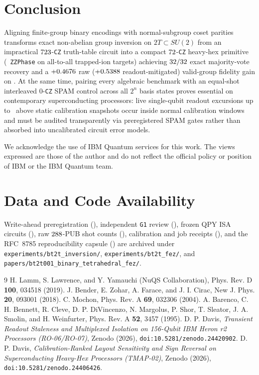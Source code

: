 \documentclass[aps,prx,twocolumn,superscriptaddress,nofootinbib]{revtex4-2}
\begin{document}
\section{Conclusion}
Aligning finite-group binary encodings with normal-subgroup coset parities transforms exact non-abelian group inversion on $2T \subset SU(2)$ from an impractical $723$-\texttt{CZ} truth-table circuit into a compact $72$-\texttt{CZ} heavy-hex primitive (\btTkStructZzOpt\ \texttt{ZZPhase} on all-to-all trapped-ion targets) achieving $32 / 32$ exact majority-vote recovery and a $+0.4676$ raw ($+0.5388$ readout-mitigated) valid-group fidelity gain on \btBackend. At the same time, pairing every algebraic benchmark with an equal-shot interleaved $0$-\texttt{CZ} SPAM control across all $2^n$ basis states proves essential on contemporary superconducting processors: live single-qubit readout excursions up to \btQTwentyFourStaleX\ above static calibration snapshots occur inside normal calibration windows and must be audited transparently via preregistered SPAM gates rather than absorbed into uncalibrated circuit error models.

\begin{acknowledgments}
We acknowledge the use of IBM Quantum services for this work. The views expressed are those of the author and do not reflect the official policy or position of IBM or the IBM Quantum team.
\end{acknowledgments}

\section*{Data and Code Availability}
Write-ahead preregistration (\btPreregSha), independent \texttt{G1} review (\btGoneSha), frozen QPY ISA circuits (\btQpySha), raw $288$-PUB shot counts (\btRawGzSha), calibration and job receipts (\btJobId), and the RFC~8785 reproducibility capsule (\btCapsuleSha) are archived under \texttt{experiments/bt2t\_inversion/}, \texttt{experiments/bt2t\_fez/}, and \texttt{papers/bt2t001\_binary\_tetrahedral\_fez/}.

\begin{thebibliography}{9}
 H. Lamm, S. Lawrence, and Y. Yamauchi (NuQS Collaboration), Phys. Rev. D \textbf{100}, 034518 (2019).
 J. Bender, E. Zohar, A. Farace, and J. I. Cirac, New J. Phys. \textbf{20}, 093001 (2018).
 C. Mochon, Phys. Rev. A \textbf{69}, 032306 (2004).
 A. Barenco, C. H. Bennett, R. Cleve, D. P. DiVincenzo, N. Margolus, P. Shor, T. Sleator, J. A. Smolin, and H. Weinfurter, Phys. Rev. A \textbf{52}, 3457 (1995).
 D. P. Davis, \emph{Transient Readout Staleness and Multiplexed Isolation on 156-Qubit IBM Heron r2 Processors (RO-06/RO-07)}, Zenodo (2026), \texttt{doi:10.5281/zenodo.24420902}.
 D. P. Davis, \emph{Calibration-Ranked Layout Sensitivity and Sign Reversal on Superconducting Heavy-Hex Processors (TMAP-02)}, Zenodo (2026), \texttt{doi:10.5281/zenodo.24406426}.
\end{thebibliography}
\end{document}

